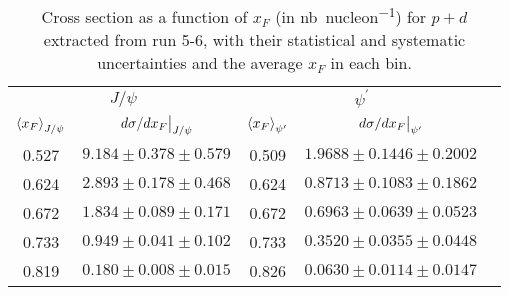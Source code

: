 \documentclass[../main.tex]{subfiles}
\begin{document}
\begin{table}[h!]
	\centering
	\caption{Cross section as a function of $x_F$ (in \unit{\nano\barn\per nucleon}) for $p+d$ extracted from run 5-6, with their statistical and systematic uncertainties and the average $x_F$ in each bin.}
	\begin{tabular}{cc|ccc}
		\hline
		\multicolumn{2}{c|}{$J/\psi$} & \multicolumn{2}{c}{$\psi^{\prime}$} &                                                                      \\ \cline{1-4}
		$\expval{x_F}_{J/\psi}$       & $\eval{d\sigma/dx_F}_{J/\psi}$      & $\expval{x_F}_{\psi^\prime}$ & $\eval{d\sigma/dx_F}_{\psi^\prime}$ & \\ \cline{1-4}
		\multicolumn{1}{c|}{0.527}    & $9.184\pm0.378\pm0.579$             & \multicolumn{1}{c|}{0.509}   & $1.9688\pm0.1446\pm0.2002$          & \\
		\multicolumn{1}{c|}{0.624}    & $2.893\pm0.178\pm0.468$             & \multicolumn{1}{c|}{0.624}   & $0.8713\pm0.1083\pm0.1862$          & \\
		\multicolumn{1}{c|}{0.672}    & $1.834\pm0.089\pm0.171$             & \multicolumn{1}{c|}{0.672}   & $0.6963\pm0.0639\pm0.0523$          & \\
		\multicolumn{1}{c|}{0.733}    & $0.949\pm0.041\pm0.102$             & \multicolumn{1}{c|}{0.733}   & $0.3520\pm0.0355\pm0.0448$          & \\
		\multicolumn{1}{c|}{0.819}    & $0.180\pm0.008\pm0.015$             & \multicolumn{1}{c|}{0.826}   & $0.0630\pm0.0114\pm0.0147$          & \\ \cline{1-4}
	\end{tabular}
\end{table}


\end{document}
